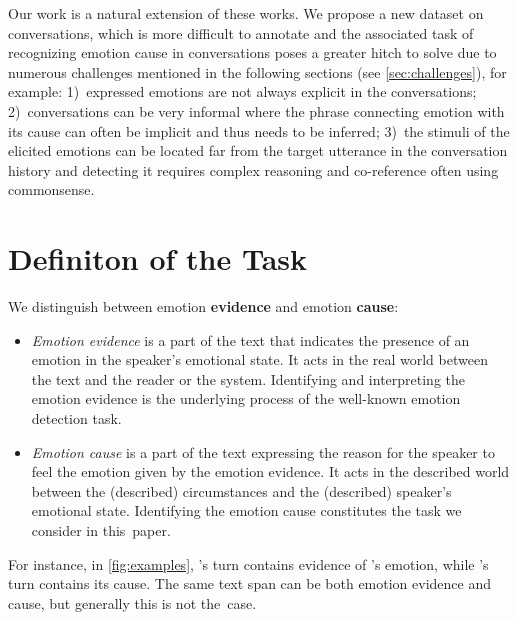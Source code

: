 \documentclass[11pt,a4paper]{article}
\theoremstyle{definition}
\begin{document}
Our work is a natural extension of these 
works. We propose a new dataset on conversations, which is more difficult to annotate and the associated task of recognizing emotion cause in conversations poses a greater hitch to solve due to numerous challenges mentioned in the following sections (see \cref{sec:challenges}), for example:
1)~expressed emotions are not always explicit in the conversations; 2)~conversations can be very informal where the phrase connecting emotion with its cause can often be implicit and thus needs to be inferred; 3)~the stimuli of the elicited emotions can be located far from the target utterance in the conversation history and detecting it requires complex reasoning and co-reference often using commonsense.






























\section{Definiton of the Task}
\label{sec:terminology}

We distinguish between emotion \textbf{evidence} and emotion \textbf{cause}:
\begin{itemize}[leftmargin=*]
    \item \textit{Emotion evidence} is a part of the text that indicates the presence of an emotion in the speaker's emotional state. It acts in the real world between the text and the reader or the system. Identifying and interpreting the emotion evidence is the underlying process of the well-known emotion detection task. 
    \item \textit{Emotion cause} is a part of the text expressing the reason for the speaker to feel the emotion given by the emotion evidence. It acts in the 
described world
    between the (described) circumstances and the (described) speaker's emotional state. Identifying the emotion cause constitutes the task we consider in this~paper.
\end{itemize}
For instance, in \cref{fig:examples}, 's turn contains evidence of 's emotion, while 's turn contains its cause.
The same text span can be both emotion evidence and cause, but generally this is not the~case.
\end{document}
